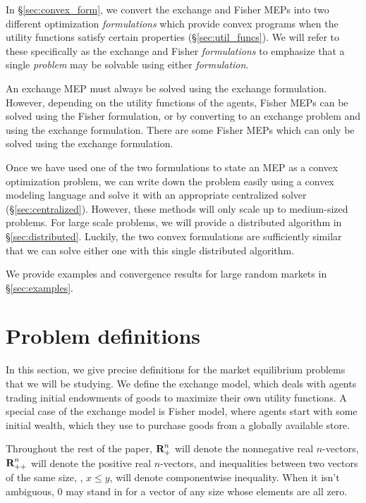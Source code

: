 \documentclass[12pt]{article}
\begin{document}
In \S\ref{sec:convex_form}, we convert the exchange and Fisher MEPs into two
different optimization \emph{formulations} which provide convex programs when
the utility functions satisfy certain properties (\S\ref{sec:util_funcs}). We
will refer to these specifically as the exchange and Fisher \emph{formulations}
to emphasize that a single \emph{problem} may be solvable using either
\emph{formulation}.

An exchange MEP must always be solved using the exchange formulation. However,
depending on the utility functions of the agents, Fisher MEPs can be solved
using the Fisher formulation, or by converting to an exchange problem and using
the exchange formulation. There are some Fisher MEPs which can only be solved
using the exchange formulation.

Once we have used one of the two formulations to state an MEP as a convex
optimization problem, we can write down the problem easily using a convex
modeling language and solve it with an appropriate centralized solver
(\S\ref{sec:centralized}). However, these methods will only scale up to
medium-sized problems. For large scale problems, we will provide a distributed
algorithm in \S\ref{sec:distributed}. Luckily, the two convex formulations are
sufficiently similar that we can solve either one with this single distributed
algorithm.

We provide examples and convergence results for large random markets in
\S\ref{sec:examples}.


\section{Problem definitions}
\label{sec:defs}

In this section, we give precise definitions for the market equilibrium
problems that we will be studying. We define the exchange model, which deals
with agents trading initial endowments of goods to maximize their own utility
functions. A special case of the exchange model is Fisher model, where agents
start with some initial wealth, which they use to purchase goods  from a
globally available store.

Throughout the rest of the paper, ${\mbox{\bf R}}^n_+$ will denote the nonnegative
real $n$-vectors, ${\mbox{\bf R}}^n_{++}$ will denote the positive real $n$-vectors,
and inequalities between two vectors of the same size, \eg, $x \leq y$,
will denote componentwise inequality. When it isn't ambiguous, $0$ may stand
in for a vector of any size whose elements are all zero.
\end{document}
